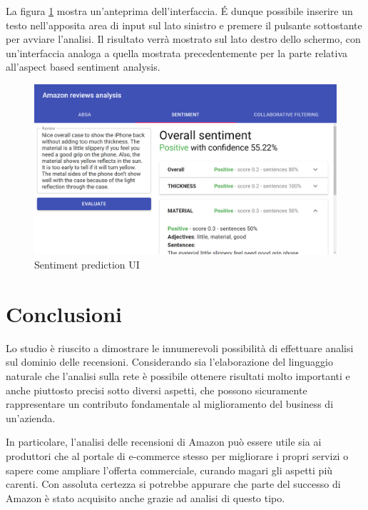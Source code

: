 \documentclass[hidelinks, 12pt]{article}
\begin{document}
La figura \ref{fig:sentiment_ui_prediction} mostra un'anteprima dell'interfaccia. \'E dunque possibile inserire un testo nell'apposita area di input sul lato sinistro e premere il pulsante sottostante per avviare l'analisi. Il risultato verrà mostrato sul lato destro dello schermo, con un'interfaccia analoga a quella mostrata precedentemente per la parte relativa all'aspect based sentiment analysis.

\begin{figure}[H]
	\centering
	\includegraphics[scale=0.35]{images/08_03_sentiment_ui_prediction.png}
	\caption[Sentiment prediction UI]{Sentiment prediction UI}
	\label{fig:sentiment_ui_prediction}
\end{figure}



\clearpage



\section{Conclusioni}

Lo studio è riuscito a dimostrare le innumerevoli possibilità di effettuare analisi sul dominio delle recensioni. Considerando sia l'elaborazione del linguaggio naturale che l'analisi sulla rete è possibile ottenere risultati molto importanti e anche piuttosto precisi sotto diversi aspetti, che possono sicuramente rappresentare un contributo fondamentale al miglioramento del business di un'azienda.

In particolare, l'analisi delle recensioni di Amazon può essere utile sia ai produttori che al portale di e-commerce stesso per migliorare i propri servizi o sapere come ampliare l'offerta commerciale, curando magari gli aspetti più carenti. Con assoluta certezza si potrebbe appurare che parte del successo di Amazon è stato acquisito anche grazie ad analisi di questo tipo.
\end{document}
